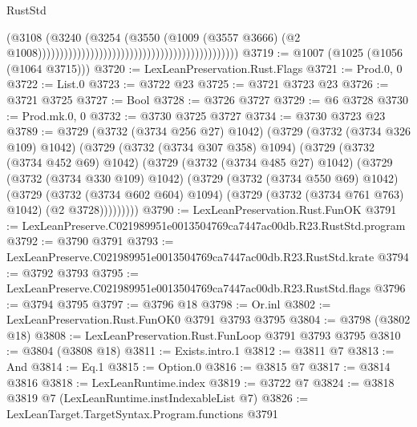 \begin{lexlean}{RustStd}
\begin{coremodule}
                                                                                    (@3108
                                                                                      (@3240
                                                                                        (@3254
                                                                                          (@3550
                                                                                            (@1009
                                                                                              (@3557
                                                                                                @3666)
                                                                                              (@2
                                                                                                @1008))))))))))))))))))))))))))))))))))))))))))))))
@3719 := @1007 (@1025 (@1056 (@1064 @3715)))
@3720 := LexLeanPreservation.Rust.Flags
@3721 := Prod.{0, 0}
@3722 := List.{0}
@3723 := @3722 @23
@3725 := @3721 @3723 @23
@3726 := @3721 @3725
@3727 := Bool
@3728 := @3726 @3727
@3729 := @6 @3728
@3730 := Prod.mk.{0, 0}
@3732 := @3730 @3725 @3727
@3734 := @3730 @3723 @23
@3789 := @3729
    (@3732 (@3734 @256 @27) @1042)
    (@3729
      (@3732 (@3734 @326 @109) @1042)
      (@3729
        (@3732 (@3734 @307 @358) @1094)
        (@3729
          (@3732 (@3734 @452 @69) @1042)
          (@3729
            (@3732 (@3734 @485 @27) @1042)
            (@3729
              (@3732 (@3734 @330 @109) @1042)
              (@3729
                (@3732 (@3734 @550 @69) @1042)
                (@3729
                  (@3732 (@3734 @602 @604) @1094)
                  (@3729 (@3732 (@3734 @761 @763) @1042) (@2 @3728)))))))))
@3790 := LexLeanPreservation.Rust.FunOK
@3791 := LexLeanPreserve.C021989951e0013504769ca7447ac00db.R23.RustStd.program
@3792 := @3790 @3791
@3793 := LexLeanPreserve.C021989951e0013504769ca7447ac00db.R23.RustStd.krate
@3794 := @3792 @3793
@3795 := LexLeanPreserve.C021989951e0013504769ca7447ac00db.R23.RustStd.flags
@3796 := @3794 @3795
@3797 := @3796 @18
@3798 := Or.inl
@3802 := LexLeanPreservation.Rust.FunOK0 @3791 @3793 @3795
@3804 := @3798 (@3802 @18)
@3808 := LexLeanPreservation.Rust.FunLoop @3791 @3793 @3795
@3810 := @3804 (@3808 @18)
@3811 := Exists.intro.{1}
@3812 := @3811 @7
@3813 := And
@3814 := Eq.{1}
@3815 := Option.{0}
@3816 := @3815 @7
@3817 := @3814 @3816
@3818 := LexLeanRuntime.index
@3819 := @3722 @7
@3824 := @3818 @3819 @7 (LexLeanRuntime.instIndexableList @7)
@3826 := LexLeanTarget.TargetSyntax.Program.functions @3791

\end{coremodule}
\end{lexlean}
